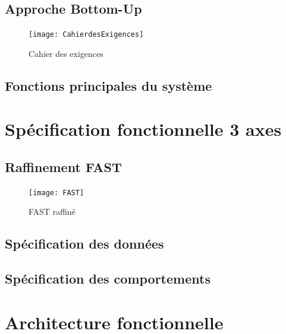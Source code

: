 \section{Approche Bottom-Up}

\begin{figure}[H]
  \centering
  \texttt{[image: CahierdesExigences]}
  \caption{Cahier des exigences}
  \label{fig:exigences}
\end{figure}

\section{Fonctions principales du système}

\chapter{Spécification fonctionnelle  3 axes}

\section{Raffinement FAST}

\begin{figure}[H]
  \centering
  \texttt{[image: FAST]}
  \caption{FAST raffiné}
  \label{fig:FAST}
\end{figure}

\section{Spécification des données}
\section{Spécification des comportements}


\chapter{Architecture fonctionnelle}


